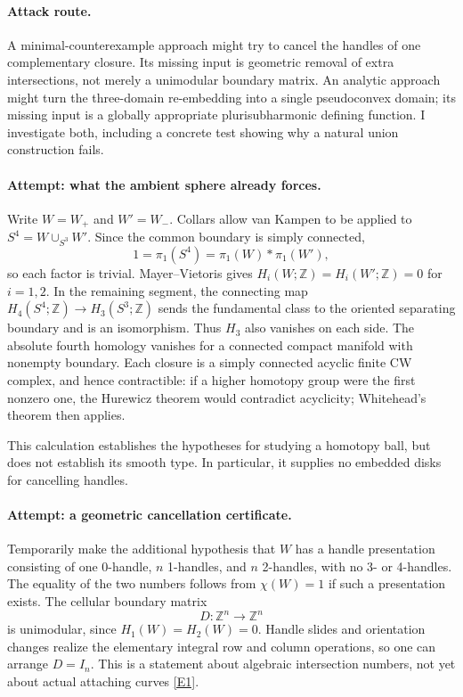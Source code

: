 \documentclass[11pt,a4paper]{article}
\newcommand{\Z}{\mathbb{Z}}
\newcommand{\eref}[2]{\hyperlink{extra:#1:#2}{[E#2]}}
\numberwithin{equation}{section}
\begin{document}
\paragraph{Attack route.}
A minimal-counterexample approach might try to cancel the handles of
one complementary closure. Its missing input is geometric removal of
extra intersections, not merely a unimodular boundary matrix. An
analytic approach might turn the three-domain re-embedding into a
single pseudoconvex domain; its missing input is a globally appropriate
plurisubharmonic defining function. I investigate both, including a
concrete test showing why a natural union construction fails.

\paragraph{Attempt: what the ambient sphere already forces.}
Write $W=W_+$ and $W'=W_-$. Collars allow van Kampen to be applied to
$S^4=W\cup_{S^3}W'$. Since the common boundary is simply connected,
\begin{equation}
  1=\pi_1(S^4)=\pi_1(W)*\pi_1(W'),
\end{equation}
so each factor is trivial. Mayer--Vietoris gives $H_i(W;\Z)=
H_i(W';\Z)=0$ for $i=1,2$. In the remaining segment, the connecting
map $H_4(S^4;\Z)\to H_3(S^3;\Z)$ sends the fundamental class to the
oriented separating boundary and is an isomorphism. Thus $H_3$ also
vanishes on each side. The absolute fourth homology vanishes for a
connected compact manifold with nonempty boundary. Each closure is a
simply connected acyclic finite CW complex, and hence contractible:
if a higher homotopy group were the first nonzero one, the Hurewicz
theorem would contradict acyclicity; Whitehead's theorem then applies.

This calculation establishes the hypotheses for studying a homotopy
ball, but does not establish its smooth type. In particular, it supplies
no embedded disks for cancelling handles.

\paragraph{Attempt: a geometric cancellation certificate.}
Temporarily make the additional hypothesis that $W$ has a handle
presentation consisting of one 0-handle, $n$ 1-handles, and $n$ 2-handles,
with no 3- or 4-handles. The equality of the two numbers follows from
$\chi(W)=1$ if such a presentation exists. The cellular boundary matrix
\begin{equation}
 D:\Z^n\longrightarrow\Z^n
\end{equation}
is unimodular, since $H_1(W)=H_2(W)=0$. Handle slides and orientation
changes realize the elementary integral row and column operations, so
one can arrange $D=I_n$. This is a statement about algebraic intersection
numbers, not yet about actual attaching curves \eref{3410}{1}.
\end{document}
